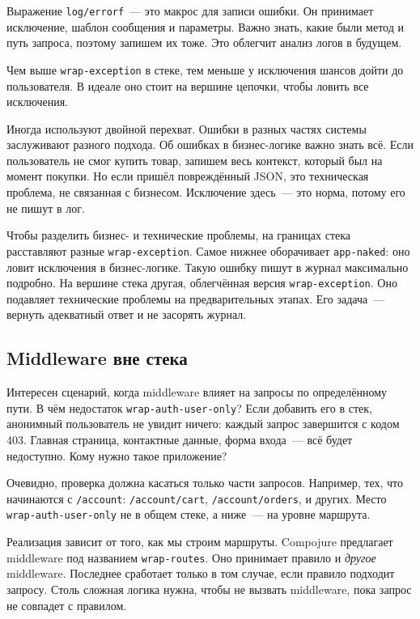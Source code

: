 
Выражение \verb|log/errorf|~--- это макрос для записи ошибки. Он принимает
исключение, шаблон сообщения и параметры. Важно знать, какие были метод и путь
запроса, поэтому запишем их тоже. Это облегчит анализ логов в будущем.

Чем выше \verb|wrap-exception| в стеке, тем меньше у исключения шансов дойти
до пользователя. В идеале оно стоит на вершине цепочки, чтобы ловить все
исключения.

Иногда используют двойной перехват. Ошибки в разных частях системы заслуживают
разного подхода. Об ошибках в бизнес-логике важно знать всё. Если
пользователь не смог купить товар, запишем весь контекст, который был на момент
покупки. Но если пришёл повреждённый JSON, это техническая проблема, не
связанная с бизнесом. Исключение здесь~--- это норма, потому его не пишут в лог.

Чтобы разделить бизнес- и технические проблемы, на границах стека расставляют
разные \verb|wrap-exception|. Самое нижнее оборачивает \verb|app-naked|: оно
ловит исключения в бизнес-логике. Такую ошибку пишут в журнал максимально
подробно. На вершине стека другая, облегчённая версия \verb|wrap-exception|.
Оно подавляет технические проблемы на предварительных этапах. Его задача~--- вернуть
адекватный ответ и не засорять журнал.

\subsection{Middleware вне стека}


Интересен сценарий, когда middleware влияет на запросы по определённому пути. В
чём недостаток \verb|wrap-auth-user-only|? Если добавить его в стек, анонимный
пользователь не увидит ничего: каждый запрос завершится с кодом 403. Главная
страница, контактные данные, форма входа~--- всё будет недоступно. Кому
нужно такое приложение?

Очевидно, проверка должна касаться только части запросов. Например, тех, что
начинаются с \verb|/account|: \verb|/account/cart|, \verb|/account/orders|,
и других. Место \verb|wrap-auth-user-only| не в общем стеке, а ниже~--- на
уровне маршрута.

Реализация зависит от того, как мы строим маршруты. Compojure предлагает
middleware под названием \verb|wrap-routes|. Оно принимает правило и
\emph{другое} middleware. Последнее сработает только в том случае, если правило
подходит запросу. Столь сложная логика нужна, чтобы не вызвать middleware, пока
запрос не совпадет с правилом.

